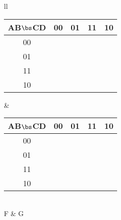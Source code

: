 \begin{description}
        \begin{tabular}{ll}
            \begin{tabular} {c||c|c|c|c}
                AB$\bs$CD & 00 & 01 & 11 & 10 \\ \hline \hline
                00        &    &    &    &    \\ \hline
                01        &    &    &    &    \\ \hline
                11        &    &    &    &    \\ \hline
                10        &    &    &    &    \\
            \end{tabular}        &
            \begin{tabular} {c||c|c|c|c}
                AB$\bs$CD & 00 & 01 & 11 & 10 \\ \hline \hline
                00        &    &    &    &    \\ \hline
                01        &    &    &    &    \\ \hline
                11        &    &    &    &    \\ \hline
                10        &    &    &    &    \\
            \end{tabular}        \\
            F & G \vspace{0.1in}\\
        \end{tabular}

\end{description}
